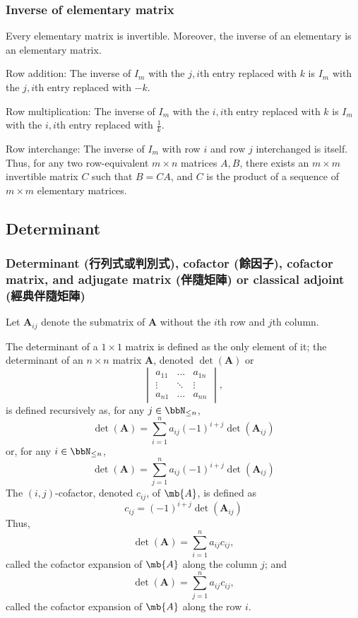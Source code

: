 \documentclass[a4paper,12pt]{report}
\begin{document}
\subsubsection{Inverse of elementary matrix}
Every elementary matrix is invertible. Moreover, the inverse of an elementary is an elementary matrix.
\bit
\item Row addition: The inverse of $I_m$ with the $j,i$th entry replaced with $k$ is $I_m$ with the $j,i$th entry replaced with $-k$.
\item Row multiplication: The inverse of $I_m$ with the $i,i$th entry replaced with $k$ is $I_m$ with the $i,i$th entry replaced with $\frac{1}{k}$.
\item Row interchange: The inverse of $I_m$ with row $i$ and row $j$ interchanged is itself.
\eit
Thus, for any two row-equivalent $m\times n$ matrices $A,B$, there exists an $m\times m$ invertible matrix $C$ such that $B=CA$, and $C$ is the product of a sequence of $m\times m$ elementary matrices.
\subsection{Determinant}
\subsubsection{Determinant (行列式或判別式), cofactor (餘因子), cofactor matrix, and adjugate matrix (伴隨矩陣) or classical adjoint (經典伴隨矩陣)}
Let $\mathbf{A}_{ij}$ denote the submatrix of $\mathbf{A}$ without the $i$th row and $j$th column.

The determinant of a $1\times 1$ matrix is defined as the only element of it; the determinant of an $n\times n$ matrix $\mathbf{A}$, denoted $\det(\mathbf{A})$ or 
\[\begin{vmatrix}a_{11} & \ldots & a_{1n}\\\vdots & \ddots & \vdots\\a_{n1} & \ldots & a_{nn}\end{vmatrix},\]
is defined recursively as, for any $j\in\bbN_{\le n}$,
\[\det(\mathbf{A})=\sum_{i=1}^na_{ij}(-1)^{i+j}\det(\mathbf{A}_{ij})\]
or, for any $i\in\bbN_{\le n}$,
\[\det(\mathbf{A})=\sum_{j=1}^na_{ij}(-1)^{i+j}\det(\mathbf{A}_{ij})\]
The $(i,j)$-cofactor, denoted $c_{ij}$, of $\mb{A}$, is defined as
\[c_{ij}=(-1)^{i+j}\det(\mathbf{A}_{ij})\]
Thus,
\[\det(\mathbf{A})=\sum_{i=1}^na_{ij}c_{ij},\]
called the cofactor expansion of $\mb{A}$ along the column $j$; and
\[\det(\mathbf{A})=\sum_{j=1}^na_{ij}c_{ij},\]
called the cofactor expansion of $\mb{A}$ along the row $i$.
\end{document}
